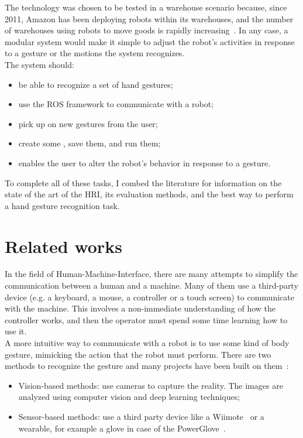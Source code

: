 \documentclass[../thesis.tex]{subfiles}
\begin{document}
The technology was chosen to be tested in a warehouse scenario because, since 2011, Amazon has been deploying robots within its warehouses, and the number of warehouses using robots to move goods is rapidly increasing~\cite{paper:bogue2016}. In any case, a modular system would make it simple to adjust the robot's activities in response to a gesture or the motions the system recognizes.\\
The system should:
\begin{itemize}
    \item be able to recognize a set of hand gestures;
    \item use the \acrshort{ROS} framework to communicate with a robot;
    \item pick up on new gestures from the user;
    \item create some , save them, and run them;
    \item enables the user to alter the robot's behavior in response to a gesture.
\end{itemize}
To complete all of these tasks, I combed the literature for information on the state of the art of the \acrshort{HRI}, its evaluation methods, and the best way to perform a hand gesture recognition task.

\section{Related works}
In the field of Human-Machine-Interface, there are many attempts to simplify the communication between a human and a machine. Many of them use a third-party device (e.g. a keyboard, a mouse, a controller or a touch screen) to communicate with the machine. This involves a non-immediate understanding of how the controller works, and then the operator must spend some time learning how to use it.\\

A more intuitive way to communicate with a robot is to use some kind of body gesture, mimicking the action that the robot must perform. There are two methods to recognize the gesture and many projects have been built on them~\cite{paper:design_and_evaluate_hand_gesture}:
\begin{itemize}
    \item Vision-based methods: use cameras to capture the reality. The images are analyzed using computer vision and deep learning techniques;
    \item Sensor-based methods: use a third party device like a Wiimote~\cite{paper:guo2008exploring} or a wearable, for example a glove in case of the PowerGlove~\cite{paper:kessler1995evaluation}.
\end{itemize}\\
\end{document}
